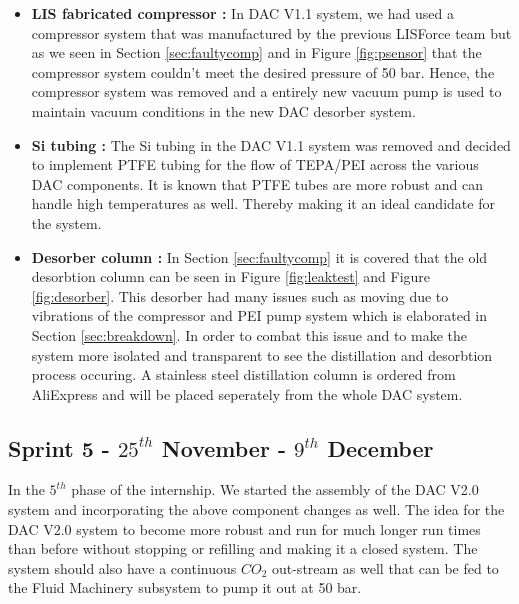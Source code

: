 \begin{itemize}
    \item \textbf{LIS fabricated compressor :} In DAC V1.1 system, we had used a compressor system that was manufactured by the previous LISForce team but as we seen in Section \ref{sec:faultycomp} and in Figure \ref{fig:psensor} that the compressor system couldn't meet the desired pressure of 50 bar. Hence, the compressor system was removed and a entirely new vacuum pump is used to maintain vacuum conditions in the new DAC desorber system. 
    
    \item \textbf{Si tubing :} The Si tubing in the DAC V1.1 system was removed and decided to implement PTFE tubing for the flow of TEPA/PEI across the various DAC components. It is known that PTFE tubes are more robust and can handle high temperatures as well. Thereby making it an ideal candidate for the system. 
    
    \item \textbf{Desorber column :} In Section \ref{sec:faultycomp} it is covered that the old desorbtion column can be seen in Figure \ref{fig:leaktest} and Figure \ref{fig:desorber}. This desorber had many issues such as moving due to vibrations of the compressor and PEI pump system which is elaborated in Section \ref{sec:breakdown}. In order to combat this issue and to make the system more isolated and transparent to see the distillation and desorbtion process occuring. A stainless steel distillation column is ordered from AliExpress and will be placed seperately from the whole DAC system.  
\end{itemize} 

\subsection{Sprint 5 - $25^{th}$ November - $9^{th}$ December}

In the $5^{th}$ phase of the internship. We started the assembly of the DAC V2.0 system and incorporating the above component changes as well. The idea for the DAC V2.0 system to become more robust and run for much longer run times than before without stopping or refilling and making it a closed system. The system should also have a continuous $CO_2$ out-stream as well that can be fed to the Fluid Machinery subsystem to pump it out at 50 bar.  
















